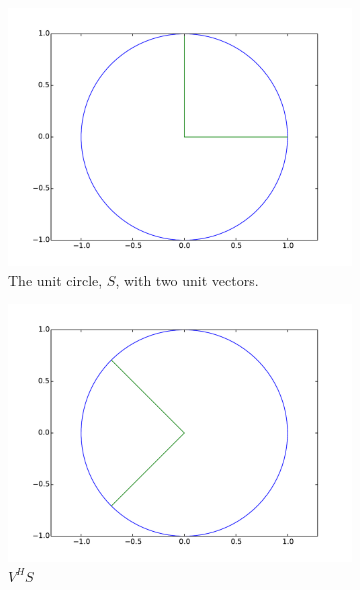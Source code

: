 \begin{figure}
\centering
\begin{subfigure}[b]{.49\textwidth}
  \centering
  \includegraphics[width=\textwidth]{unit_circle.pdf}
  \caption{The unit circle, $S$, with two unit vectors.}
\end{subfigure}
\begin{subfigure}[b]{.49\textwidth}
  \centering
  \includegraphics[width=\textwidth]{vcircle.pdf}
  \caption{$V^HS$}
\end{subfigure}
\begin{subfigure}[b]{.49\textwidth}
  \centering

\end{subfigure}
\end{figure}
